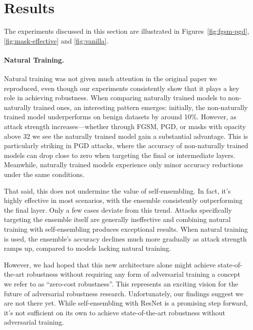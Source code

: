 \documentclass[a4paper, oneside]{discothesis}
\begin{document}
\section{Results}

The experiments discussed in this section are illustrated in Figures~\ref{fig:fgsm-pgd}, \ref{fig:mask-effective} and \ref{fig:vanilla}.

\paragraph{Natural Training.}

Natural training was not given much attention in the original paper we reproduced, even though our experiments consistently show that it plays a key role in achieving robustness. When comparing naturally trained models to non-naturally trained ones, an interesting pattern emerges: initially, the non-naturally trained model underperforms on benign datasets by around 10\%. However, as attack strength increases—whether through FGSM, PGD, or masks with opacity above 32 \textendash{} we see the naturally trained model gain a substantial advantage. This is particularly striking in PGD attacks, where the accuracy of non-naturally trained models can drop close to zero when targeting the final or intermediate layers. Meanwhile, naturally trained models experience only minor accuracy reductions under the same conditions.

That said, this does not undermine the value of self-ensembling. In fact, it's highly effective in most scenarios, with the ensemble consistently outperforming the final layer. Only a few cases deviate from this trend. Attacks specifically targeting the ensemble itself are generally ineffective and combining natural training with self-ensembling produces exceptional results. When natural training is used, the ensemble's accuracy declines much more gradually as attack strength ramps up, compared to models lacking natural training.

However, we had hoped that this new architecture alone might achieve state-of-the-art robustness without requiring any form of adversarial training \textendash{} a concept we refer to as ``zero-cost robustness''. This represents an exciting vision for the future of adversarial robustness research. Unfortunately, our findings suggest we are not there yet. While self-ensembling with ResNet is a promising step forward, it's not sufficient on its own to achieve state-of-the-art robustness without adversarial training.
\end{document}
